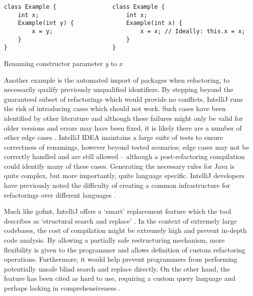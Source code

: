 \begin{center}
\begin{fig}
\begin{verbatim}
class Example {                class Example {
    int x;                         int x;
    Example(int y) {               Example(int x) {
        x = y;                         x = x; // Ideally: this.x = x;
    }                              }
}                              }
\end{verbatim}
\caption{Renaming constructor parameter \emph{y} to \emph{x}}
\label{Fig:qual}
\end{fig}
\end{center}

Another example is the automated import of packages when refactoring, to necessarily qualify previously unqualified identifiers. By stepping beyond the guaranteed subset of refactorings which would provide no conflicts, IntelliJ runs the risk of introducing cases which should not work. Such cases have been identified by other literature and although these failures might only be valid for older versions and errors may have been fixed, it is likely there are a number of other edge cases \cite{jemerov2008implementing}. IntelliJ IDEA maintains a large suite of tests to ensure correctness of renamings, however beyond tested scenarios; edge cases may not be correctly handled and are still allowed -- although a post-refactoring compilation could identify many of these cases. Generating the necessary rules for Java is quite complex, but more importantly, quite language specific. IntelliJ developers have previously noted the difficulty of creating a common infrastructure for refactorings over different languages \cite{jemerov2008implementing}.

Much like gofmt, IntelliJ offers a `smart' replacement feature which the tool describes as `structural search and replace' \cite{jemerov2008implementing}. In the context of extremely large codebases, the cost of compilation might be extremely high and prevent in-depth code analysis. By allowing a partially safe restructuring mechanism, more flexibility is given to the programmer and allows definition of custom refactoring operations. Furthermore, it would help prevent programmers from performing potentially unsafe blind search and replace directly. On the other hand, the feature has been cited as hard to use, requiring a custom query language and perhaps lacking in comprehensiveness \cite{jemerov2008implementing}.

